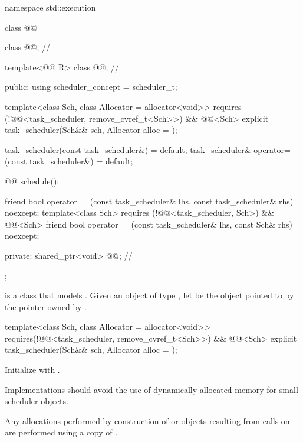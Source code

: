 \begin{codeblock}
namespace std::execution {
  class @@ {
    class @@;                    // \expos

    template<@@ R>
      class @@;                      // \expos

  public:
    using scheduler_concept = scheduler_t;

    template<class Sch, class Allocator = allocator<void>>
      requires (!@@<task_scheduler, remove_cvref_t<Sch>>)
        && @@<Sch>
    explicit task_scheduler(Sch&& sch, Allocator alloc = {});

    task_scheduler(const task_scheduler&) = default;
    task_scheduler& operator=(const task_scheduler&) = default;

    @@ schedule();

    friend bool operator==(const task_scheduler& lhs, const task_scheduler& rhs)
        noexcept;
    template<class Sch>
      requires (!@@<task_scheduler, Sch>)
      && @@<Sch>
    friend bool operator==(const task_scheduler& lhs, const Sch& rhs) noexcept;

  private:
    shared_ptr<void> @@; // \expos
  };
}
\end{codeblock}

\pnum
{} is a class that models
.
Given an object  of type , let
 be the object
pointed to by the pointer owned by .

\begin{itemdecl}
template<class Sch, class Allocator = allocator<void>>
  requires(!@@<task_scheduler, remove_cvref_t<Sch>>) && @@<Sch>
explicit task_scheduler(Sch&& sch, Allocator alloc = {});
\end{itemdecl}
\begin{itemdescr}
\pnum
\effects
Initialize  with
.

\pnum
\recommended
Implementations should avoid the use of dynamically
allocated memory for small scheduler objects.

\pnum
\remarks
Any allocations performed by construction of  or
 objects resulting from calls on  are
performed using a copy of .
\end{itemdescr}

